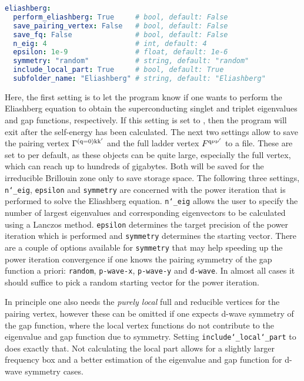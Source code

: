 \documentclass[../../main.tex]{subfiles}
\begin{document}
\begin{minipage}{\textwidth}%
\begin{lstlisting}[language=yaml]
eliashberg:
  perform_eliashberg: True     # bool, default: False
  save_pairing_vertex: False   # bool, default: False
  save_fq: False               # bool, default: False
  n_eig: 4                     # int, default: 4
  epsilon: 1e-9                # float, default: 1e-6
  symmetry: "random"           # string, default: "random"
  include_local_part: True     # bool, default: True
  subfolder_name: "Eliashberg" # string, default: "Eliashberg"
\end{lstlisting}
\end{minipage}
Here, the first setting is to let the program know if one wants to perform the Eliashberg equation to obtain the superconducting singlet and triplet eigenvalues and gap functions, respectively. If this setting is set to , then the program will exit after the self-energy has been calculated. The next two settings allow to save the pairing vertex $\Gamma^{(\text{q}=0)\text{k}\text{k}'}$ and the full ladder vertex $F^{\text{q}\nu\nu'}$ to a file. These are set to  per default, as these objects can be quite large, especially the full vertex, which can reach up to hundreds of gigabytes. Both will be saved for the irreducible Brillouin zone only to save storage space. The following three settings, \texttt{n\char`_eig}, \texttt{epsilon} and \texttt{symmetry} are concerned with the power iteration that is performed to solve the Eliashberg equation. \texttt{n\char`_eig} allows the user to specify the number of largest eigenvalues and corresponding eigenvectors to be calculated using a Lanczos method. \texttt{epsilon} determines the target precision of the power iteration which is performed and \texttt{symmetry} determines the starting vector. There are a couple of options available for \texttt{symmetry} that may help speeding up the power iteration convergence if one knows the pairing symmetry of the gap function a priori: \texttt{random}, \texttt{p-wave-x}, \texttt{p-wave-y} and \texttt{d-wave}. In almost all cases it should suffice to pick a random starting vector for the power iteration. 

In principle one also needs the \textit{purely local} full and reducible vertices for the pairing vertex, however these can be omitted if one expects d-wave symmetry of the gap function, where the local vertex functions do not contribute to the eigenvalue and gap function due to symmetry. Setting \texttt{include\char`_local\char`_part} to  does exactly that. Not calculating the local part allows for a slightly larger frequency box and a better estimation of the eigenvalue and gap function for d-wave symmetry cases.
\end{document}

